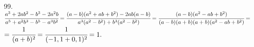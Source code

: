 99. $\cfrac{a^3+2ab^2-b^3-2a^2b}{a^5+a^2b^3-b^5-a^3b^2}=\cfrac{(a-b)(a^2+ab+b^2)-2ab(a-b)}{a^3(a^2-b^2)+b^3(a^2-b^2)}=
\cfrac{(a-b)(a^2-ab+b^2)}{(a-b)(a+b)(a+b)(a^2-ab+b^2)}=$\\$=\cfrac{1}{(a+b)^2}=\cfrac{1}{(-1,1+0,1)^2}=1.$\\
